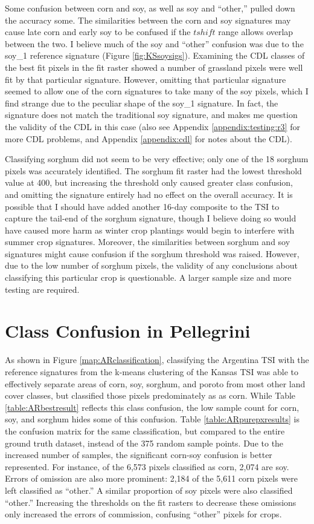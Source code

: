 Some confusion between corn and soy, as well as soy and ``other,'' pulled down the accuracy some. The similarities between the corn and soy signatures may cause late corn and early soy to be confused if the $tshift$ range allows overlap between the two. I believe much of the soy and ``other'' confusion was due to the soy\_1 reference signature (Figure \ref{fig:KSsoysigs}). Examining the CDL classes of the best fit pixels in the fit raster showed a number of grassland pixels were well fit by that particular signature. However, omitting that particular signature seemed to allow one of the corn signatures to take many of the soy pixels, which I find strange due to the peculiar shape of the soy\_1 signature. In fact, the signature does not match the traditional soy signature, and makes me question the validity of the CDL in this case (also see Appendix \ref{appendix:testing:r3} for more CDL problems, and Appendix \ref{appendix:cdl} for notes about the CDL).

Classifying sorghum did not seem to be very effective; only one of the 18 sorghum pixels was accurately identified. The sorghum fit raster had the lowest threshold value at 400, but increasing the threshold only caused greater class confusion, and omitting the signature entirely had no effect on the overall accuracy. It is possible that I should have added another 16-day composite to the TSI to capture the tail-end of the sorghum signature, though I believe doing so would have caused more harm as winter crop plantings would begin to interfere with summer crop signatures. Moreover, the similarities between sorghum and soy signatures might cause confusion if the sorghum threshold was raised. However, due to the low number of sorghum pixels, the validity of any conclusions about classifying this particular crop is questionable. A larger sample size and more testing are required.

\section{Class Confusion in Pellegrini}

As shown in Figure \ref{map:ARclassification}, classifying the Argentina TSI with the reference signatures from the k-means clustering of the Kansas TSI was able to effectively separate areas of corn, soy, sorghum, and poroto from most other land cover classes, but classified those pixels predominately as as corn. While Table \ref{table:ARbestresult} reflects this class confusion, the low sample count for corn, soy, and sorghum hides some of this confusion. Table \ref{table:ARpurepxresults} is the confusion matrix for the same classification, but compared to the entire ground truth dataset, instead of the 375 random sample points. Due to the increased number of samples, the significant corn-soy confusion is better represented. For instance, of the 6,573 pixels classified as corn, 2,074 are soy. Errors of omission are also more prominent: 2,184 of the 5,611 corn pixels were left classified as ``other.'' A similar proportion of soy pixels were also classified ``other.'' Increasing the thresholds on the fit rasters to decrease these omissions only increased the errors of commission, confusing ``other'' pixels for crops.


